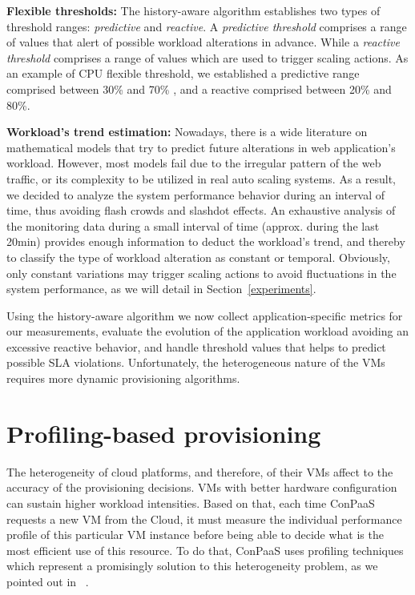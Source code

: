 \textbf{Flexible thresholds:} The history-aware algorithm establishes two types of threshold ranges: \emph{predictive} and \emph{reactive}. A \emph{predictive threshold} comprises a range of values that alert of possible workload alterations in advance. While a \emph{reactive threshold} comprises a range of values which are used to trigger scaling actions. As an example of CPU flexible threshold, we established a predictive range comprised between 30\% and 70\% , and a reactive comprised between 20\% and 80\%.  

\textbf{Workload's trend estimation:} Nowadays, there is a wide literature on mathematical models that try to predict future alterations in web application's workload. However, most models fail due to the irregular pattern of the web traffic, or its complexity to be utilized in real auto scaling systems. As a result, we decided to analyze the system performance behavior during an interval of time, thus avoiding flash crowds and slashdot effects. An exhaustive analysis of the monitoring data during a small interval of time (approx. during the last 20min) provides enough information to deduct the workload's trend, and thereby to classify the type of workload alteration as constant or temporal. Obviously, only constant variations may trigger scaling actions to avoid fluctuations in the system performance, as we will detail in Section~\ref{experiments}.

Using the history-aware algorithm we now collect application-specific metrics for our measurements, evaluate the evolution of the application workload avoiding an excessive reactive behavior, and handle threshold values that helps to predict possible SLA violations. Unfortunately, the heterogeneous nature of the VMs requires more dynamic provisioning algorithms. 



\section*{Profiling-based provisioning}

The heterogeneity of cloud platforms, and therefore, of their VMs affect to the accuracy of the provisioning decisions. VMs with better hardware configuration can sustain higher workload intensities. Based on that, each time ConPaaS requests a new VM from the Cloud, it must measure the individual performance profile of this particular VM instance before being able to decide what is the most efficient use of this resource. To do that, ConPaaS uses profiling techniques which represent a promisingly solution to this heterogeneity problem,  as we pointed out in ~\cite{jiangThesis}. 

